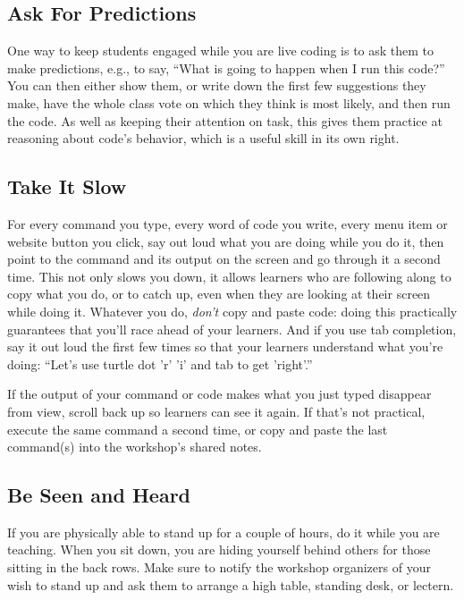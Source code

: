 \subsection*{Ask For Predictions}

One way to keep students engaged while you are live coding is to ask
them to make predictions, e.g., to say, ``What is going to happen when
I run this code?''  You can then either show them, or write down the
first few suggestions they make, have the whole class vote on which
they think is most likely, and then run the code.  As well as keeping
their attention on task, this gives them practice at reasoning about
code's behavior, which is a useful skill in its own right.

\subsection*{Take It Slow}

For every command you type, every word of code you write, every menu
item or website button you click, say out loud what you are doing
while you do it, then point to the command and its output on the
screen and go through it a second time. This not only slows you down,
it allows learners who are following along to copy what you do, or to
catch up, even when they are looking at their screen while doing
it. Whatever you do, \emph{don't} copy and paste code: doing this
practically guarantees that you'll race ahead of your learners.  And
if you use tab completion, say it out loud the first few times so that
your learners understand what you're doing: ``Let's use turtle dot 'r'
'i' and tab to get 'right'.''

If the output of your command or code makes what you just typed
disappear from view, scroll back up so learners can see it again.  If
that's not practical, execute the same command a second time, or copy
and paste the last command(s) into the workshop's shared notes.

\subsection*{Be Seen and Heard}

If you are physically able to stand up for a couple of hours, do it
while you are teaching. When you sit down, you are hiding yourself
behind others for those sitting in the back rows. Make sure to notify
the workshop organizers of your wish to stand up and ask them to
arrange a high table, standing desk, or lectern.

